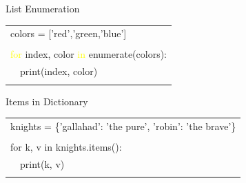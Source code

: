 \documentclass[serif, aspectratio=169]{beamer}
\newcommand{\tgreen}[1]{\textcolor{green}{#1}}
\newcommand{\tyellow}[1]{\textcolor{yellow}{#1}}
\newenvironment{CLI} %
    {
    \noindent
    \ttfamily 
    \footnotesize
    \begin{tcolorbox}[colback=gray!150,colframe=black]
    \color{white}
    \begin{tabular}{p{4.5cm}p{7.5cm}}
    }
    { 
    \end{tabular}
    \end{tcolorbox}
    }
\begin{document}
\begin{frame}{List Enumeration}
    \begin{CLI}
        \multicolumn{2}{l}{colors = ['red','green,'blue']} \\
        & \\
        \multicolumn{2}{l}{\tyellow{for} index, color \tyellow{in} enumerate(colors):} \\
        ~~print(index, color) & \\
        & \\
    \end{CLI}
\end{frame}

\begin{frame}{Items in Dictionary}
    \begin{CLI}
        \multicolumn{2}{l}{knights = \{'gallahad': 'the pure', 'robin': 'the brave'\}} \\
        & \\
        \multicolumn{2}{l}{for k, v in knights.items():} \\
        ~~print(k, v) & \\
        & \\
    \end{CLI}
\end{frame}
\end{document}
